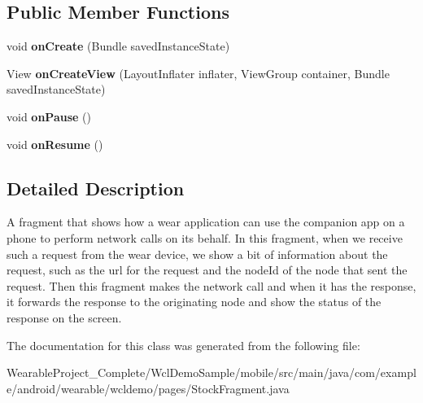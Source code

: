 \subsection*{Public Member Functions}
\begin{DoxyCompactItemize}
\item 
void {\bfseries on\+Create} (Bundle saved\+Instance\+State)\hypertarget{classcom_1_1example_1_1android_1_1wearable_1_1wcldemo_1_1pages_1_1StockFragment_af40baf2bfca1f1fded9f54aba1ed60c1}{}\label{classcom_1_1example_1_1android_1_1wearable_1_1wcldemo_1_1pages_1_1StockFragment_af40baf2bfca1f1fded9f54aba1ed60c1}

\item 
View {\bfseries on\+Create\+View} (Layout\+Inflater inflater, View\+Group container, Bundle saved\+Instance\+State)\hypertarget{classcom_1_1example_1_1android_1_1wearable_1_1wcldemo_1_1pages_1_1StockFragment_aa3c6cd9f246d1f4f0f3572c8e47e5e22}{}\label{classcom_1_1example_1_1android_1_1wearable_1_1wcldemo_1_1pages_1_1StockFragment_aa3c6cd9f246d1f4f0f3572c8e47e5e22}

\item 
void {\bfseries on\+Pause} ()\hypertarget{classcom_1_1example_1_1android_1_1wearable_1_1wcldemo_1_1pages_1_1StockFragment_a3235e20d0026727fd7a398ab7d69882b}{}\label{classcom_1_1example_1_1android_1_1wearable_1_1wcldemo_1_1pages_1_1StockFragment_a3235e20d0026727fd7a398ab7d69882b}

\item 
void {\bfseries on\+Resume} ()\hypertarget{classcom_1_1example_1_1android_1_1wearable_1_1wcldemo_1_1pages_1_1StockFragment_a599d1cd083c7f52a21056548a140b71c}{}\label{classcom_1_1example_1_1android_1_1wearable_1_1wcldemo_1_1pages_1_1StockFragment_a599d1cd083c7f52a21056548a140b71c}

\end{DoxyCompactItemize}


\subsection{Detailed Description}
A fragment that shows how a wear application can use the companion app on a phone to perform network calls on its behalf. In this fragment, when we receive such a request from the wear device, we show a bit of information about the request, such as the url for the request and the node\+Id of the node that sent the request. Then this fragment makes the network call and when it has the response, it forwards the response to the originating node and show the status of the response on the screen. 

The documentation for this class was generated from the following file\+:\begin{DoxyCompactItemize}
\item 
Wearable\+Project\+\_\+\+Complete/\+Wcl\+Demo\+Sample/mobile/src/main/java/com/example/android/wearable/wcldemo/pages/Stock\+Fragment.\+java\end{DoxyCompactItemize}

